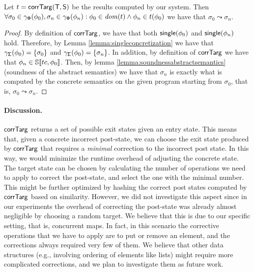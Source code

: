 \begin{theorem}
	Let $t=\mathsf{corrTarg}(\mathsf{T}, \mathsf{S})$ be the results computed by our system. Then $\forall \sigma_0 \in \gamma_{\mathsf{\Phi}}(\phi_0), \sigma_n \in \gamma_{\mathsf{\Phi}}(\phi_n) : \phi_0 \in \mathit{dom}(t) \land \phi_n \in t(\phi_0)$ we have that $\sigma_0 \leadsto \sigma_n$.
\end{theorem}
\begin{proof}
By definition of $\mathsf{corrTarg}$, we have that both $\mathsf{single}(\phi_0)$ and $\mathsf{single}(\phi_n)$ hold. Therefore, by Lemma \ref{lemma:singleconcretization} we have that $\gamma_{\mathsf{\Sigma}}(\phi_0) = \{\sigma_0\}$ and $\gamma_{\mathsf{\Sigma}}(\phi_0) = \{\sigma_n\}$. In addition, by definition of $\mathsf{corrTarg}$ we have that $\phi_n \in \mathbb{S}\llbracket tc, \phi_0 \rrbracket$. Then, by lemma \ref{lemma:soundnessabstractsemantics} (soundness of the abstract semantics) we have that $\sigma_n$ is exactly what is computed by the concrete semantics on the given program starting from $\sigma_0$, that is, $\sigma_0 \leadsto \sigma_n$. 
\end{proof}



\paragraph{Discussion.}
$\mathsf{corrTarg}$ returns a set of possible exit states given an entry state. This means that, given a concrete incorrect post-state, we can choose the exit state produced by $\mathsf{corrTarg}$ that requires a \emph{minimal} correction to the incorrect post state. In this way, we would minimize the runtime overhead of adjusting the concrete state. The target state can be chosen by calculating the number of operations we need to apply to correct the post-state, and select the one with the minimal number. This might be further optimized by hashing the correct post states computed by $\mathsf{corrTarg}$ based on similarity.
However, we did not investigate this aspect since in our experiments the overhead of correcting the post-state was already almost negligible by choosing a random target. We believe that this is due to our specific setting, that is, concurrent maps. In fact, in this scenario the corrective operations that we have to apply are to put or remove an element, and the corrections always required very few of them. We believe that other data structures (e.g., involving ordering of elements like lists) might require more complicated corrections, and we plan to investigate them as future work.


